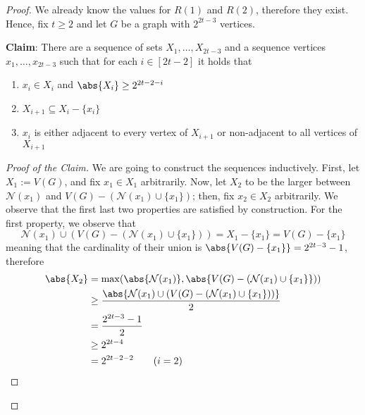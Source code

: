 \documentclass[a4paper, 12pt]{report}
\begin{document}
    \begin{proof}
        We already know the values for $R(1)$ and $R(2)$, therefore they exist. Hence, fix $t \ge 2$ and let $G$ be a graph with $2^{2t - 3}$ vertices.
        
        \textbf{Claim}: There are a sequence of sets $X_1, \ldots, X_{2t -3}$ and a sequence vertices$x_1, \ldots , x_{2t - 3}$ such that for each $i \in [2t - 2]$ it holds that

        \begin{enumerate}
            \item $x_i \in X_i$ and $\abs{X_i} \ge 2^{2t - 2 - i}$
            \item $X_{i + 1} \subseteq X_i - \{x_i\}$
            \item $x_i$ is either adjacent to every vertex of $X_{i + 1}$ or non-adjacent to all vertices of $X_{i + 1}$
        \end{enumerate}

        \begin{proof}[Proof of the Claim]
            We are going to construct the sequences inductively. First, let $X_1 := V(G)$, and fix $x_1 \in X_1$ arbitrarily. Now, let $X_2$ to be the larger between $\mathcal N(x_1)$ and $V(G) - (\mathcal N(x_1) \cup \{x_1\})$; then, fix $x_2 \in X_2$ arbitrarily. We observe that the first last two properties are satisfied by construction. For the first property, we observe that $$\mathcal N (x_1) \cup (V(G) - (\mathcal N(x_1) \cup \{x_1\})) = X_1 - \{x_1\} = V(G) - \{x_1\}$$ meaning that the cardinality of their union is $\abs{V(G) - \{x_1\}} = 2^{2t - 3} - 1$, therefore
            \begin{equation*}
                \begin{split}
                    \abs{X_2} &= \max(\abs{\mathcal N(x_1)}, \abs{V(G) - (\mathcal N(x_1) \cup \{x_1\}})) \\
                              &\ge \dfrac{\abs{\mathcal N (x_1) \cup (V(G) - (\mathcal N(x_1) \cup \{x_1\}))}}{2} \\
                              &= \dfrac{2^{2t - 3} - 1}{2} \\
                              &\ge 2^{2t - 4} \\
                              &= 2^{2t - 2 - 2} \quad \quad (i = 2)
                \end{split}
            \end{equation*}


\end{proof}
\end{proof}
\end{document}
